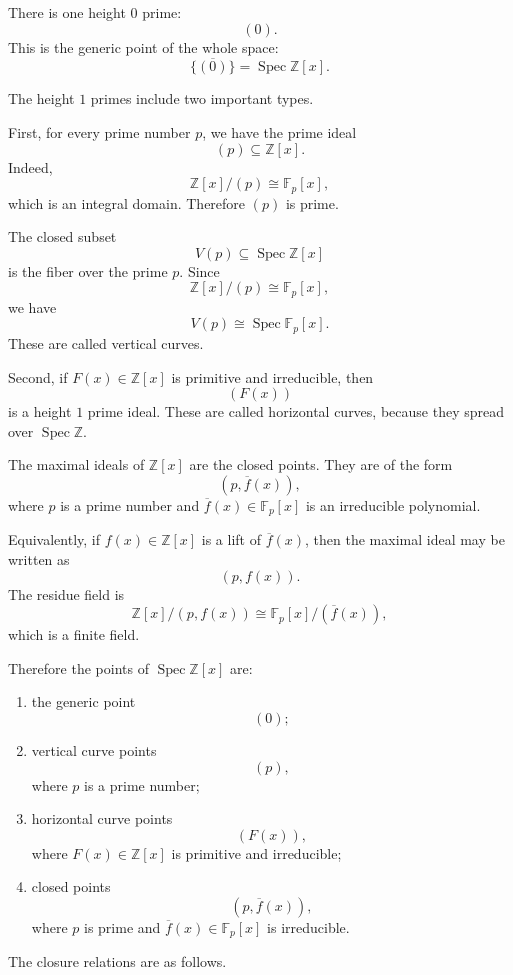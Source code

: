\documentclass[12pt,a4paper]{article}
\newcommand{\Spec}{\operatorname{Spec}}
\begin{document}
	There is one height \(0\) prime:
	\[
	(0).
	\]
	This is the generic point of the whole space:
	\[
	\overline{\{(0)\}}=\Spec\mathbb Z[x].
	\]
	
	The height \(1\) primes include two important types.
	
	First, for every prime number \(p\), we have the prime ideal
	\[
	(p)\subseteq \mathbb Z[x].
	\]
	Indeed,
	\[
	\mathbb Z[x]/(p)\cong \mathbb F_p[x],
	\]
	which is an integral domain. Therefore \((p)\) is prime.
	
	The closed subset
	\[
	V(p)\subseteq \Spec\mathbb Z[x]
	\]
	is the fiber over the prime \(p\). Since
	\[
	\mathbb Z[x]/(p)\cong \mathbb F_p[x],
	\]
	we have
	\[
	V(p)\cong \Spec \mathbb F_p[x].
	\]
	These are called vertical curves.
	
	Second, if \(F(x)\in \mathbb Z[x]\) is primitive and irreducible, then
	\[
	(F(x))
	\]
	is a height \(1\) prime ideal. These are called horizontal curves, because they
	spread over \(\Spec\mathbb Z\).
	
	The maximal ideals of \(\mathbb Z[x]\) are the closed points. They are of the
	form
	\[
	(p,\overline f(x)),
	\]
	where \(p\) is a prime number and \(\overline f(x)\in\mathbb F_p[x]\) is an
	irreducible polynomial.
	
	Equivalently, if \(f(x)\in\mathbb Z[x]\) is a lift of \(\overline f(x)\), then
	the maximal ideal may be written as
	\[
	(p,f(x)).
	\]
	The residue field is
	\[
	\mathbb Z[x]/(p,f(x))
	\cong
	\mathbb F_p[x]/(\overline f(x)),
	\]
	which is a finite field.
	
	Therefore the points of \(\Spec\mathbb Z[x]\) are:
	
	\begin{enumerate}[label=\arabic*)]
		\item the generic point
		\[
		(0);
		\]
		
		\item vertical curve points
		\[
		(p),
		\]
		where \(p\) is a prime number;
		
		\item horizontal curve points
		\[
		(F(x)),
		\]
		where \(F(x)\in\mathbb Z[x]\) is primitive and irreducible;
		
		\item closed points
		\[
		(p,\overline f(x)),
		\]
		where \(p\) is prime and \(\overline f(x)\in\mathbb F_p[x]\) is irreducible.
	\end{enumerate}
	
	The closure relations are as follows.
	
\end{document}
